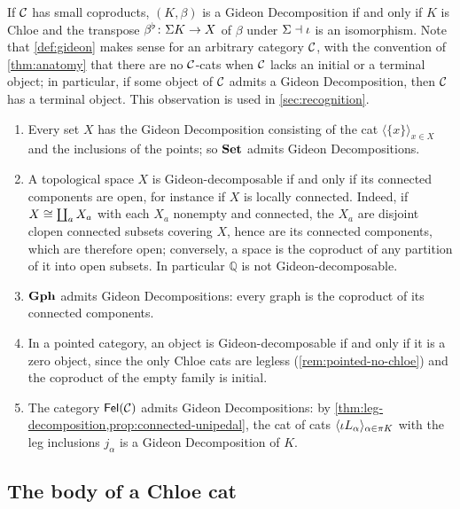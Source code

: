 If $\mathcal{C}$ has small coproducts, $(K,\beta)$ is a Gideon Decomposition if and only
if $K$ is Chloe and the transpose $\beta^\flat\colon\Sigma K\to X$ of $\beta$ under
$\Sigma\dashv\iota$ is an isomorphism. Note that \cref{def:gideon} makes sense for
an arbitrary category $\mathcal{C}$, with the convention of \cref{thm:anatomy} that
there are no $\mathcal{C}$-cats when $\mathcal{C}$ lacks an initial or a terminal object; in
particular, if some object of $\mathcal{C}$ admits a Gideon Decomposition, then $\mathcal{C}$
has a terminal object. This observation is used in \cref{sec:recognition}.

\begin{example}\label{ex:gideon}
\begin{enumerate}
\item Every set $X$ has the Gideon Decomposition consisting of the cat
  $\langle\{x\}\rangle_{x\in X}$ and the inclusions of the points; so $\mathbf{Set}$
  admits Gideon Decompositions.
\item A topological space $X$ is Gideon-decomposable if and only if its connected
  components are open, for instance if $X$ is locally connected. Indeed, if
  $X\cong\coprod_aX_a$ with each $X_a$ nonempty and connected, the $X_a$ are
  disjoint clopen connected subsets covering $X$, hence are its connected
  components, which are therefore open; conversely, a space is the coproduct of
  any partition of it into open subsets. In particular $\mathbb Q$ is not
  Gideon-decomposable.
\item $\mathbf{Gph}$ admits Gideon Decompositions: every graph is the coproduct of its
  connected components.
\item In a pointed category, an object is Gideon-decomposable if and only if it is
  a zero object, since the only Chloe cats are legless
  (\cref{rem:pointed-no-chloe}) and the coproduct of the empty family is initial.
\item The category $\mathsf{Fel}(\mathcal{C})$ admits Gideon Decompositions: by
  \cref{thm:leg-decomposition,prop:connected-unipedal}, the cat of cats
  $\langle\iota L_\alpha\rangle_{\alpha\in\pi K}$ with the leg inclusions $j_\alpha$
  is a Gideon Decomposition of $K$.
\end{enumerate}
\end{example}

\subsection{The body of a Chloe cat}\label{sec:chloe-body}

